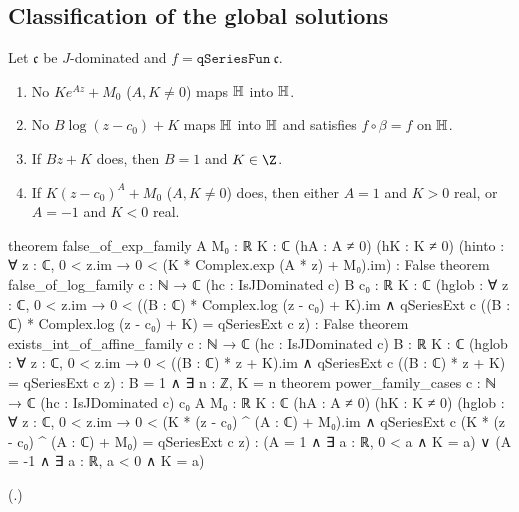\subsection{Classification of the global solutions}

\begin{theorem}\label{ch19:thm:classification}
Let $\mathfrak c$ be $J$-dominated and $f=\mathtt{qSeriesFun}\ \mathfrak c$.
\begin{enumerate}[label=(\alph*)]
\item No $Ke^{Az}+M_0$ ($A,K\ne0$) maps $\mathbb{H}$ into $\mathbb{H}$.
\item No $B\log(z-c_0)+K$ maps $\mathbb{H}$ into $\mathbb{H}$ and satisfies $f\circ\beta=f$ on $\mathbb{H}$.
\item If $Bz+K$ does, then $B=1$ and $K\in\Z$.
\item If $K(z-c_0)^A+M_0$ ($A,K\ne0$) does, then either $A=1$ and $K>0$ real, or $A=-1$ and $K<0$ real.
\end{enumerate}
\end{theorem}
\begin{leancode}
theorem false_of_exp_family {A M₀ : ℝ} {K : ℂ} (hA : A ≠ 0) (hK : K ≠ 0)
    (hinto : ∀ z : ℂ, 0 < z.im → 0 < (K * Complex.exp (A * z) + M₀).im) : False
theorem false_of_log_family {c : ℕ → ℂ} (hc : IsJDominated c) {B c₀ : ℝ} {K : ℂ}
    (hglob : ∀ z : ℂ, 0 < z.im → 0 < ((B : ℂ) * Complex.log (z - c₀) + K).im ∧
      qSeriesExt c ((B : ℂ) * Complex.log (z - c₀) + K) = qSeriesExt c z) : False
theorem exists_int_of_affine_family {c : ℕ → ℂ} (hc : IsJDominated c) {B : ℝ} {K : ℂ}
    (hglob : ∀ z : ℂ, 0 < z.im → 0 < ((B : ℂ) * z + K).im ∧
      qSeriesExt c ((B : ℂ) * z + K) = qSeriesExt c z) :
    B = 1 ∧ ∃ n : ℤ, K = n
theorem power_family_cases {c : ℕ → ℂ} (hc : IsJDominated c) {c₀ A M₀ : ℝ} {K : ℂ}
    (hA : A ≠ 0) (hK : K ≠ 0)
    (hglob : ∀ z : ℂ, 0 < z.im → 0 < (K * (z - c₀) ^ (A : ℂ) + M₀).im ∧
      qSeriesExt c (K * (z - c₀) ^ (A : ℂ) + M₀) = qSeriesExt c z) :
    (A = 1 ∧ ∃ a : ℝ, 0 < a ∧ K = a) ∨ (A = -1 ∧ ∃ a : ℝ, a < 0 ∧ K = a)
\end{leancode}
(.)
